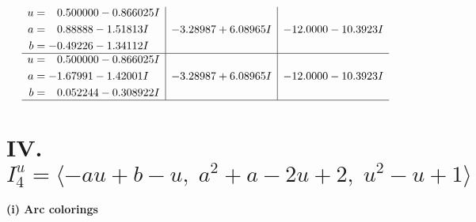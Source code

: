 \documentclass[1p]{elsarticle_modified}
\theoremstyle{definition}
\begin{document}
$$\begin{array}{c|c|c}
\begin{aligned}
u &= \phantom{-}0.500000 - 0.866025 I \\
a &= \phantom{-}0.88888 - 1.51813 I \\
b &= -0.49226 - 1.34112 I\end{aligned}
 & -3.28987 + 6.08965 I & -12.0000 - 10.3923 I \\ \hline\begin{aligned}
u &= \phantom{-}0.500000 - 0.866025 I \\
a &= -1.67991 - 1.42001 I \\
b &= \phantom{-}0.052244 - 0.308922 I\end{aligned}
 & -3.28987 + 6.08965 I & -12.0000 - 10.3923 I\\
 \hline 
 \end{array}$$\newpage\newpage\renewcommand{\arraystretch}{1}
\centering \section*{IV. $I^u_{4}= \langle - a u+b- u,\;a^2+a-2 u+2,\;u^2- u+1 \rangle$}
\flushleft \textbf{(i) Arc colorings}\\
\end{document}
